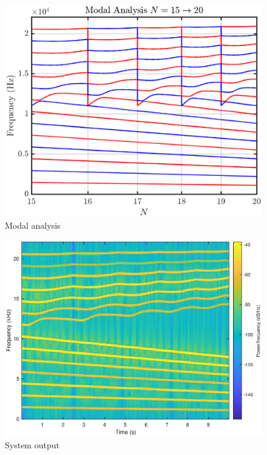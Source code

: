 \documentclass[dvipsnames, reprint]{JASA}
\begin{document}
\begin{figure}[ht]
\includegraphics[width=\reprintcolumnwidth]{modesAddPointsAtRightBound.eps}
\caption{\label{fig:modalAnalysis}{Modal analysis}}
\end{figure} 
\begin{figure}[ht]
\includegraphics[width=\reprintcolumnwidth]{specAddPointsAtRightBound.eps}
\caption{\label{fig:spectrogram}{System output}}
\end{figure} 
\end{document}
